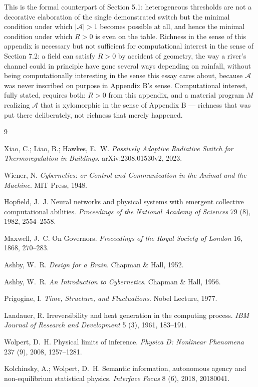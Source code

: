 \documentclass[11pt]{article}
\begin{document}
This is the formal counterpart of Section 5.1: heterogeneous thresholds are not a decorative elaboration of the single demonstrated switch but the minimal condition under which $|\mathcal A| > 1$ becomes possible at all, and hence the minimal condition under which $R > 0$ is even on the table. Richness in the sense of this appendix is necessary but not sufficient for computational interest in the sense of Section 7.2: a field can satisfy $R>0$ by accident of geometry, the way a river's channel could in principle have gone several ways depending on rainfall, without being computationally interesting in the sense this essay cares about, because $\mathcal A$ was never inscribed on purpose in Appendix B's sense. Computational interest, fully stated, requires both: $R>0$ from this appendix, and a material program $M$ realizing $\mathcal A$ that is xylomorphic in the sense of Appendix B --- richness that was put there deliberately, not richness that merely happened.

\newpage
\begin{thebibliography}{9}

Xiao, C.; Liao, B.; Hawkes, E.\ W.
\textit{Passively Adaptive Radiative Switch for Thermoregulation in Buildings}.
arXiv:2308.01530v2, 2023.

Wiener, N.
\textit{Cybernetics: or Control and Communication in the Animal and the Machine}.
MIT Press, 1948.

Hopfield, J.\ J.
Neural networks and physical systems with emergent collective computational abilities.
\textit{Proceedings of the National Academy of Sciences} 79 (8), 1982, 2554--2558.

Maxwell, J.\ C.
On Governors.
\textit{Proceedings of the Royal Society of London} 16, 1868, 270--283.

Ashby, W.\ R.
\textit{Design for a Brain}.
Chapman \& Hall, 1952.

Ashby, W.\ R.
\textit{An Introduction to Cybernetics}.
Chapman \& Hall, 1956.

Prigogine, I.
\textit{Time, Structure, and Fluctuations}.
Nobel Lecture, 1977.

Landauer, R.
Irreversibility and heat generation in the computing process.
\textit{IBM Journal of Research and Development} 5 (3), 1961, 183--191.

Wolpert, D.\ H.
Physical limits of inference.
\textit{Physica D: Nonlinear Phenomena} 237 (9), 2008, 1257--1281.

Kolchinsky, A.; Wolpert, D.\ H.
Semantic information, autonomous agency and non-equilibrium statistical physics.
\textit{Interface Focus} 8 (6), 2018, 20180041.

\end{thebibliography}
\end{document}
